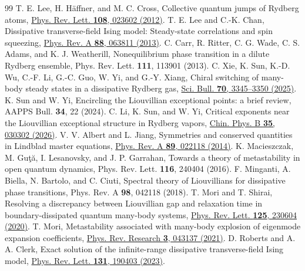 \documentclass[aps,pra,twocolumn,superscriptaddress,amsmath,amssymb,reprint,floatfix]{revtex4-2}
\begin{document}
\begin{thebibliography}{99}
 T. E. Lee, H. H\"affner, and M. C. Cross, Collective quantum jumps of Rydberg atoms, \href{https://doi.org/10.1103/PhysRevLett.108.023602}{Phys. Rev. Lett. \textbf{108}, 023602 (2012)}.
 T. E. Lee and C.-K. Chan, Dissipative transverse-field Ising model: Steady-state correlations and spin squeezing, \href{https://doi.org/10.1103/PhysRevA.88.063811}{Phys. Rev. A \textbf{88}, 063811 (2013)}.
 C. Carr, R. Ritter, C. G. Wade, C. S. Adams, and K. J. Weatherill, Nonequilibrium phase transition in a dilute Rydberg ensemble, Phys. Rev. Lett. \textbf{111}, 113901 (2013).
 C. Xie, K. Sun, K.-D. Wu, C.-F. Li, G.-C. Guo, W. Yi, and G.-Y. Xiang, Chiral switching of many-body steady states in a dissipative Rydberg gas, \href{https://doi.org/10.1016/j.scib.2025.08.051}{Sci. Bull. \textbf{70}, 3345--3350 (2025)}.
 K. Sun and W. Yi, Encircling the Liouvillian exceptional points: a brief review, AAPPS Bull. \textbf{34}, 22 (2024).
 C. Li, K. Sun, and W. Yi, Critical exponents near the Liouvillian exceptional structure in Rydberg vapors, \href{https://doi.org/10.1088/1674-1056/adfb57}{Chin. Phys. B \textbf{35}, 030302 (2026)}.
 V. V. Albert and L. Jiang, Symmetries and conserved quantities in Lindblad master equations, \href{https://doi.org/10.1103/PhysRevA.89.022118}{Phys. Rev. A \textbf{89}, 022118 (2014)}.
 K. Macieszczak, M. Gu\c{t}\u{a}, I. Lesanovsky, and J. P. Garrahan, Towards a theory of metastability in open quantum dynamics, Phys. Rev. Lett. \textbf{116}, 240404 (2016).
 F. Minganti, A. Biella, N. Bartolo, and C. Ciuti, Spectral theory of Liouvillians for dissipative phase transitions, Phys. Rev. A \textbf{98}, 042118 (2018).
 T. Mori and T. Shirai, Resolving a discrepancy between Liouvillian gap and relaxation time in boundary-dissipated quantum many-body systems, \href{https://doi.org/10.1103/PhysRevLett.125.230604}{Phys. Rev. Lett. \textbf{125}, 230604 (2020)}.
 T. Mori, Metastability associated with many-body explosion of eigenmode expansion coefficients, \href{https://doi.org/10.1103/PhysRevResearch.3.043137}{Phys. Rev. Research \textbf{3}, 043137 (2021)}.
 D. Roberts and A. A. Clerk, Exact solution of the infinite-range dissipative transverse-field Ising model, \href{https://doi.org/10.1103/PhysRevLett.131.190403}{Phys. Rev. Lett. \textbf{131}, 190403 (2023)}.

\end{thebibliography}
\end{document}
